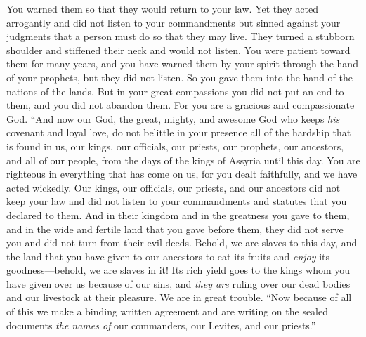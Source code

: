 \begin{biblechapter}
\verse You warned them so that they would return to your law. Yet they acted arrogantly and did not listen to your commandments but sinned against your judgments that a person must do so that they may live. They turned a stubborn shoulder and stiffened their neck and would not listen.
\verse You were patient toward them for many years, and you have warned them by your spirit through the hand of your prophets, but they did not listen. So you gave them into the hand of the nations of the lands.
\verse But in your great compassions you did not put an end to them, and you did not abandon them. For you are a gracious and compassionate God.
\verse “And now our God, the great, mighty, and awesome God who keeps \textit{his} covenant and loyal love, do not belittle in your presence all of the hardship that is found in us, our kings, our officials, our priests, our prophets, our ancestors, and all of our people, from the days of the kings of Assyria until this day.
\verse You are righteous in everything that has come on us, for you dealt faithfully, and we have acted wickedly.
\verse Our kings, our officials, our priests, and our ancestors did not keep your law and did not listen to your commandments and statutes that you declared to them.
\verse And in their kingdom and in the greatness you gave to them, and in the wide and fertile land that you gave before them, they did not serve you and did not turn from their evil deeds.
\verse Behold, we are slaves to this day, and the land that you have given to our ancestors to eat its fruits and \textit{enjoy} its goodness—behold, we are slaves in it!
\verse Its rich yield goes to the kings whom you have given over us because of our sins, and \textit{they are} ruling over our dead bodies and our livestock at their pleasure. We are in great trouble.
\verse  “Now because of all of this we make a binding written agreement and are writing on the sealed documents \textit{the names of} our commanders, our Levites, and our priests.”
\end{biblechapter}

